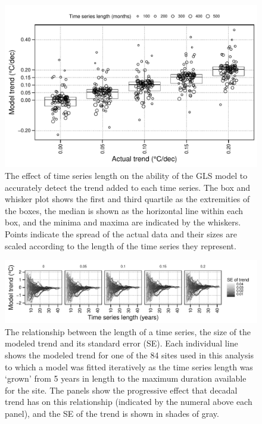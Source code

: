 \documentclass[]{ametsoc}
\begin{document}
\begin{figure}
\centering \includegraphics[width=1.0\textwidth]{figure03}
\caption{The effect of time series length on the ability of the GLS model to accurately detect the trend added to each time series. The box and whisker plot shows the first and third quartile as the extremities of the boxes, the median is shown as the horizontal line within each box, and the minima and maxima are indicated by the whiskers. Points indicate the spread of the actual data and their sizes are scaled according to the length of the time series they represent.}
\label{figure03}
\end{figure}

\begin{figure}
\centering \includegraphics[width=1.0\textwidth]{figure04}
\caption{The relationship between the length of a time series, the size of the modeled trend and its standard error (SE). Each individual line shows the modeled trend for one of the 84 sites used in this analysis to which a model was fitted iteratively as the time series length was `grown' from 5 years in length to the maximum duration available for the site. The panels show the progressive effect that decadal trend has on this relationship (indicated by the numeral above each panel), and the SE of the trend is shown in shades of gray.}
\label{figure04}
\end{figure}
\end{document}
